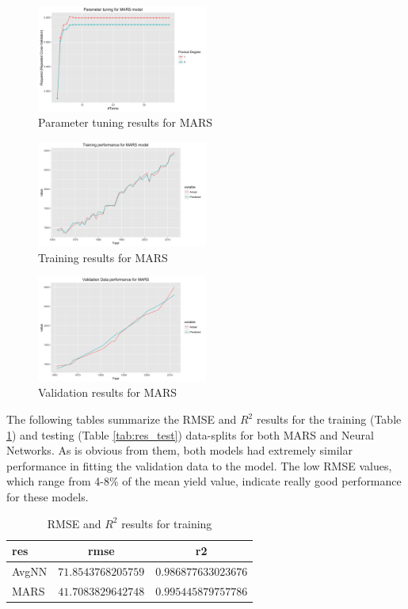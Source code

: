 \documentclass[conference]{IEEEtran}
\begin{document}
\begin{figure}[!h]
    \centering
    \includegraphics[width=0.5\textwidth]{mars_rsqr.png}
    \caption{Parameter tuning results for MARS}
    \label{res:mars_tune}
\end{figure}
\begin{figure}[!h]
    \centering
    \includegraphics[width=0.5\textwidth]{mars_training.png}
    \caption{Training results for MARS}
    \label{res:mars_train}
\end{figure}
\begin{figure}[!h]
    \centering
    \includegraphics[width=0.5\textwidth]{mars_validate.png}
    \caption{Validation results for MARS}
    \label{res:mars_test}
\end{figure}
\clearpage
The following tables summarize the RMSE and $R^2$ results for the training (Table \ref{tab:res_train}) and testing (Table \ref{tab:res_test}) data-splits for both MARS and Neural Networks. As is obvious from them, both models had extremely similar performance in fitting the validation data to the model. The low RMSE values, which range from 4-8\% of the mean yield value, indicate really good performance for these models. 
\begin{table}[!tbp]
\begin{center}
\begin{tabular}{lrr}
\hline\hline
\multicolumn{1}{l}{res}&\multicolumn{1}{c}{rmse}&\multicolumn{1}{c}{r2}\tabularnewline
\hline
AvgNN&$71.8543768205759$&$0.986877633023676$\tabularnewline
MARS&$41.7083829642748$&$0.995445879757786$\tabularnewline
\hline
\end{tabular}\end{center}
\label{tab:res_train}
\caption{RMSE and $R^2$ results for training}
\end{table} 
\end{document}
